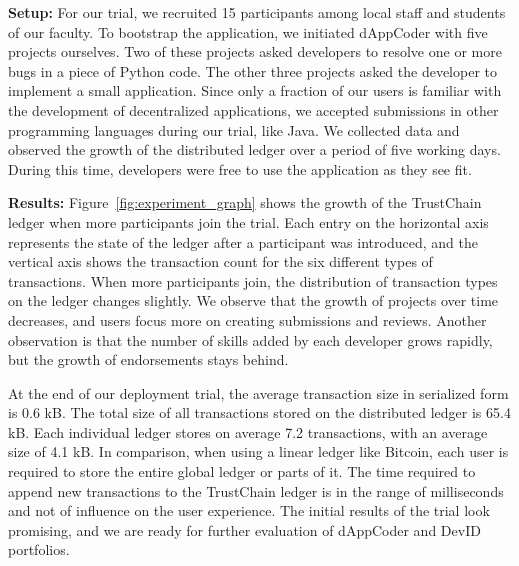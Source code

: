 \textbf{Setup:}
For our trial, we recruited 15 participants among local staff and students of our faculty.
To bootstrap the application, we initiated dAppCoder with five projects ourselves.
Two of these projects asked developers to resolve one or more bugs in a piece of Python code.
The other three projects asked the developer to implement a small application.
Since only a fraction of our users is familiar with the development of decentralized applications, we accepted submissions in other programming languages during our trial, like Java.
We collected data and observed the growth of the distributed ledger over a period of five working days.
During this time, developers were free to use the application as they see fit.

\textbf{Results:}
Figure~\ref{fig:experiment_graph} shows the growth of the TrustChain ledger when more participants join the trial.
Each entry on the horizontal axis represents the state of the ledger after a participant was introduced, and the vertical axis shows the transaction count for the six different types of transactions.
When more participants join, the distribution of transaction types on the ledger changes slightly.
We observe that the growth of projects over time decreases, and users focus more on creating submissions and reviews.
Another observation is that the number of skills added by each developer grows rapidly, but the growth of endorsements stays behind.

At the end of our deployment trial, the average transaction size in serialized form is 0.6 kB.
The total size of all transactions stored on the distributed ledger is 65.4 kB.
Each individual ledger stores on average 7.2 transactions, with an average size of 4.1 kB.
In comparison, when using a linear ledger like Bitcoin, each user is required to store the entire global ledger or parts of it.  
The time required to append new transactions to the TrustChain ledger is in the range of milliseconds and not of influence on the user experience.
The initial results of the trial look promising, and we are ready for further evaluation of dAppCoder and DevID portfolios. 

